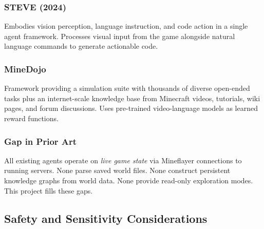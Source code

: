 \documentclass[11pt,letterpaper]{article}
\begin{document}
\subsubsection{STEVE (2024)}
Embodies vision perception, language instruction, and code action in a single agent framework. Processes visual input from the game alongside natural language commands to generate actionable code.

\subsubsection{MineDojo}
Framework providing a simulation suite with thousands of diverse open-ended tasks plus an internet-scale knowledge base from Minecraft videos, tutorials, wiki pages, and forum discussions. Uses pre-trained video-language models as learned reward functions.

\subsubsection{Gap in Prior Art}
All existing agents operate on \textit{live game state} via Mineflayer connections to running servers. None parse saved world files. None construct persistent knowledge graphs from world data. None provide read-only exploration modes. This project fills these gaps.

\subsection{Safety and Sensitivity Considerations}
\end{document}
